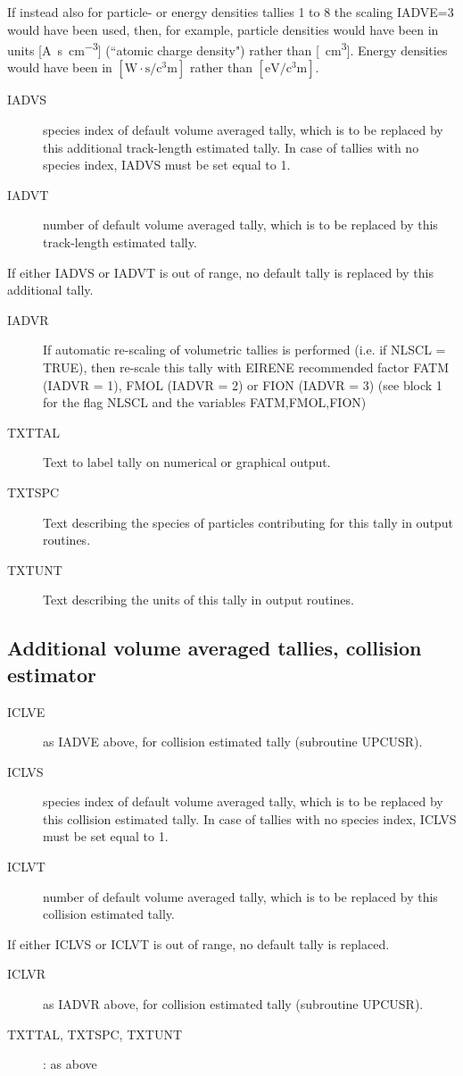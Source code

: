 If instead also for particle- or energy densities tallies 1 to 8 the scaling
IADVE=3 would have been used, then, for example, particle densities would have
been in units [\si{\ampere\second\per\cubic\centi\metre}] (``atomic charge
density") rather than [\si{\per\cubic\centi\metre}].
Energy densities would have been in $[\si{\watt} \cdot
      \si{\second\per\cubic\centi\metre}]$ rather than
$[\si{\electronvolt\per\cubic\centi\metre}]$.
\begin{description}
  \item[IADVS] species index of default volume averaged tally, which is to be
        replaced by this additional track-length estimated tally.
        In case of tallies with no species index, IADVS must be set equal to 1.
  \item[IADVT] number of default volume averaged tally, which is to be replaced
        by this track-length estimated tally.
\end{description}
If either IADVS or IADVT is out of range, no default tally is replaced by this
additional tally.
\begin{description}
  \item[IADVR] If automatic re-scaling of volumetric tallies is performed (i.e.
        if NLSCL = TRUE), then re-scale this tally with EIRENE recommended factor FATM
        (IADVR = 1), FMOL (IADVR = 2) or FION (IADVR = 3) (see block 1 for the flag
        NLSCL and the variables FATM,FMOL,FION)
  \item[TXTTAL] Text to label tally on
        numerical or graphical output.
  \item[TXTSPC] Text describing the species of particles contributing for this
        tally in output routines.
  \item[TXTUNT] Text describing the units of this tally in output routines.
\end{description}

\subsection{Additional volume averaged tallies, collision estimator}\label{sec2.10B}

\begin{description}
  \item[ICLVE] as IADVE above, for collision estimated tally (subroutine UPCUSR).
  \item[ICLVS] species index of default volume averaged tally, which is to be
        replaced by this collision estimated tally.
        In case of tallies with no species index, ICLVS must be set equal to 1.
  \item[ICLVT] number of default volume averaged tally, which is to be replaced
        by this collision estimated tally.
\end{description}
If either ICLVS or ICLVT is out of range, no default tally is replaced.
\begin{description}
  \item[ICLVR] as IADVR above, for collision estimated tally (subroutine UPCUSR).
  \item[TXTTAL, TXTSPC, TXTUNT]: as above
\end{description}

